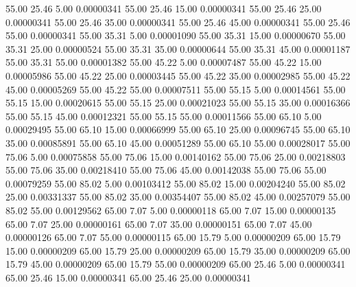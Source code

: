      55.00     25.46      5.00     0.00000341
     55.00     25.46     15.00     0.00000341
     55.00     25.46     25.00     0.00000341
     55.00     25.46     35.00     0.00000341
     55.00     25.46     45.00     0.00000341
     55.00     25.46     55.00     0.00000341
     55.00     35.31      5.00     0.00001090
     55.00     35.31     15.00     0.00000670
     55.00     35.31     25.00     0.00000524
     55.00     35.31     35.00     0.00000644
     55.00     35.31     45.00     0.00001187
     55.00     35.31     55.00     0.00001382
     55.00     45.22      5.00     0.00007487
     55.00     45.22     15.00     0.00005986
     55.00     45.22     25.00     0.00003445
     55.00     45.22     35.00     0.00002985
     55.00     45.22     45.00     0.00005269
     55.00     45.22     55.00     0.00007511
     55.00     55.15      5.00     0.00014561
     55.00     55.15     15.00     0.00020615
     55.00     55.15     25.00     0.00021023
     55.00     55.15     35.00     0.00016366
     55.00     55.15     45.00     0.00012321
     55.00     55.15     55.00     0.00011566
     55.00     65.10      5.00     0.00029495
     55.00     65.10     15.00     0.00066999
     55.00     65.10     25.00     0.00096745
     55.00     65.10     35.00     0.00085891
     55.00     65.10     45.00     0.00051289
     55.00     65.10     55.00     0.00028017
     55.00     75.06      5.00     0.00075858
     55.00     75.06     15.00     0.00140162
     55.00     75.06     25.00     0.00218803
     55.00     75.06     35.00     0.00218410
     55.00     75.06     45.00     0.00142038
     55.00     75.06     55.00     0.00079259
     55.00     85.02      5.00     0.00103412
     55.00     85.02     15.00     0.00204240
     55.00     85.02     25.00     0.00331337
     55.00     85.02     35.00     0.00354407
     55.00     85.02     45.00     0.00257079
     55.00     85.02     55.00     0.00129562
     65.00      7.07      5.00     0.00000118
     65.00      7.07     15.00     0.00000135
     65.00      7.07     25.00     0.00000161
     65.00      7.07     35.00     0.00000151
     65.00      7.07     45.00     0.00000126
     65.00      7.07     55.00     0.00000115
     65.00     15.79      5.00     0.00000209
     65.00     15.79     15.00     0.00000209
     65.00     15.79     25.00     0.00000209
     65.00     15.79     35.00     0.00000209
     65.00     15.79     45.00     0.00000209
     65.00     15.79     55.00     0.00000209
     65.00     25.46      5.00     0.00000341
     65.00     25.46     15.00     0.00000341
     65.00     25.46     25.00     0.00000341
